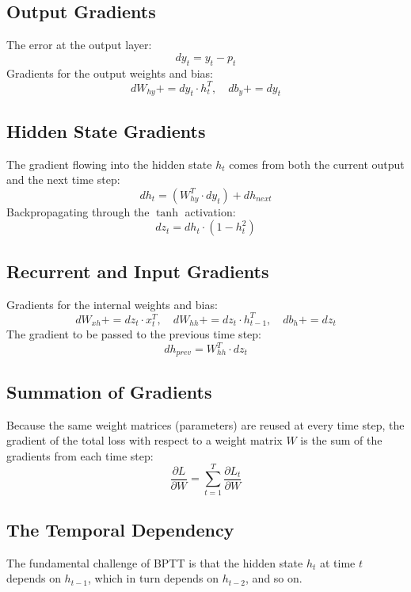 \documentclass{article}
\begin{document}
\subsection{Output Gradients}
The error at the output layer:
\begin{equation}
dy_t = y_t - p_t
\end{equation}
Gradients for the output weights and bias:
\begin{equation}
dW_{hy} += dy_t \cdot h_t^T, \quad db_y += dy_t
\end{equation}

\subsection{Hidden State Gradients}
The gradient flowing into the hidden state $h_t$ comes from both the current output and the next time step:
\begin{equation}
dh_t = (W_{hy}^T \cdot dy_t) + dh_{next}
\end{equation}
Backpropagating through the $\tanh$ activation:
\begin{equation}
dz_t = dh_t \cdot (1 - h_t^2)
\end{equation}

\subsection{Recurrent and Input Gradients}
Gradients for the internal weights and bias:
\begin{equation}
dW_{xh} += dz_t \cdot x_t^T, \quad dW_{hh} += dz_t \cdot h_{t-1}^T, \quad db_h += dz_t
\end{equation}
The gradient to be passed to the previous time step:
\begin{equation}
dh_{prev} = W_{hh}^T \cdot dz_t
\end{equation}

\subsection{Summation of Gradients}
Because the same weight matrices (parameters) are reused at every time step, the gradient of the total loss with respect to a weight matrix $W$ is the sum of the gradients from each time step:
\begin{equation}
\frac{\partial L}{\partial W} = \sum_{t=1}^{T} \frac{\partial L_t}{\partial W}
\end{equation}

\subsection{The Temporal Dependency}
The fundamental challenge of BPTT is that the hidden state $h_t$ at time $t$ depends on $h_{t-1}$, which in turn depends on $h_{t-2}$, and so on.
\end{document}
